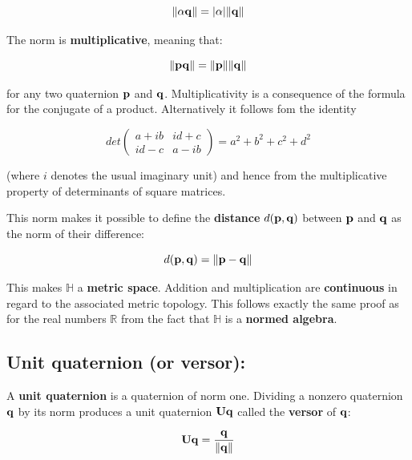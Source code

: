 \begin{equation}
    \| {\alpha \mathbf{q}} \| = | {\alpha} | \| {\mathbf{q}} \|
\end{equation}

The norm is \textbf{multiplicative}, meaning that:

\begin{equation}
    \| {\mathbf{p} \mathbf{q}} \| = \| {\mathbf{p}} \| \| {\mathbf{q}} \|
\end{equation}

for any two quaternion $ \mathbf{p} $ and $ \mathbf{q} $. Multiplicativity is a consequence of the
formula for the conjugate of a product. Alternatively it follows fom the identity

\begin{equation}
    det \left( \begin{matrix}
            a + i b & id + c \\
            id - c & a - ib
          \end{matrix} \right) = a^2 + b^2 + c^2 + d^2
\end{equation}

(where $ i $ denotes the usual imaginary unit) and hence from the multiplicative
property of determinants of square matrices.

This norm makes it possible to define the \textbf{distance} $ d(\mathbf{p},\mathbf{q}) $
between $ \mathbf{p} $ and $ \mathbf{q} $ as the norm of their difference:

\begin{equation}
    d(\mathbf{p},\mathbf{q}) = \| {\mathbf{p} - \mathbf{q}} \|
\end{equation}

This makes $ \mathbb{H} $ a \textbf{metric space}. Addition and multiplication are
\textbf{continuous} in regard to the associated metric topology. This
follows exactly the same proof as for the real numbers $ \mathbb{R} $ from the
fact that $ \mathbb{H} $ is a \textbf{normed algebra}.


\subsection{Unit quaternion (or versor):}

A \textbf{unit quaternion} is a quaternion of norm one. Dividing a nonzero quaternion
$ \mathbf{q} $ by its norm produces a unit quaternion $ \mathbf{Uq} $ called the \textbf{versor}
of $ \mathbf{q} $:

\begin{equation}
    \mathbf{Uq} = \frac{\mathbf{q}} {\| {\mathbf{q}} \|}
\end{equation}


